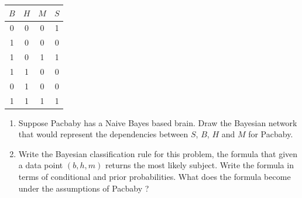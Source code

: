 \documentclass[11pt, a4paper]{article}
\begin{document}
\begin{table}[h]
    \centering
    \begin{tabular}{ccc|c}
        \toprule
        $B$ & $H$ & $M$ & $S$ \\
        \midrule
        0 & 0 & 0 & 1 \\
        1 & 0 & 0 & 0 \\
        1 & 0 & 1 & 1 \\
        1 & 1 & 0 & 0 \\
        0 & 1 & 0 & 0 \\
        1 & 1 & 1 & 1 \\
        \bottomrule
    \end{tabular}
\end{table}

\begin{enumerate}
    \item Suppose Pacbaby has a Naive Bayes based brain. Draw the Bayesian network that would represent the dependencies between $S$, $B$, $H$ and $M$ for Pacbaby.

    \begin{solution}
        \begin{figure}[H]
            \centering
        \end{figure}
    \end{solution}

    \item Write the Bayesian classification rule for this problem, \ie{} the formula that given a data point $(b, h, m)$ returns the most likely subject. Write the formula in terms of conditional and prior probabilities. What does the formula become under the assumptions of Pacbaby ?


\end{enumerate}
\end{document}
